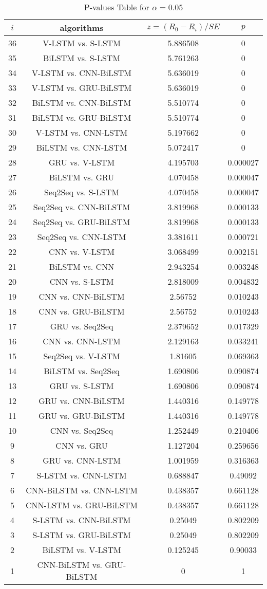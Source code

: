 \documentclass[a4paper,10pt]{article}
\begin{document}
\begin{landscape}
\begin{table}[!htp]
\centering\scriptsize
\begin{tabular}{cccc}
$i$&algorithms&$z=(R_0 - R_i)/SE$&$p$\\
\hline36&V-LSTM vs. S-LSTM&5.886508&0\\
35&BiLSTM vs. S-LSTM&5.761263&0\\
34&V-LSTM vs. CNN-BiLSTM&5.636019&0\\
33&V-LSTM vs. GRU-BiLSTM&5.636019&0\\
32&BiLSTM vs. CNN-BiLSTM&5.510774&0\\
31&BiLSTM vs. GRU-BiLSTM&5.510774&0\\
30&V-LSTM vs. CNN-LSTM&5.197662&0\\
29&BiLSTM vs. CNN-LSTM&5.072417&0\\
28&GRU vs. V-LSTM&4.195703&0.000027\\
27&BiLSTM vs. GRU&4.070458&0.000047\\
26&Seq2Seq vs. S-LSTM&4.070458&0.000047\\
25&Seq2Seq vs. CNN-BiLSTM&3.819968&0.000133\\
24&Seq2Seq vs. GRU-BiLSTM&3.819968&0.000133\\
23&Seq2Seq vs. CNN-LSTM&3.381611&0.000721\\
22&CNN vs. V-LSTM&3.068499&0.002151\\
21&BiLSTM vs. CNN&2.943254&0.003248\\
20&CNN vs. S-LSTM&2.818009&0.004832\\
19&CNN vs. CNN-BiLSTM&2.56752&0.010243\\
18&CNN vs. GRU-BiLSTM&2.56752&0.010243\\
17&GRU vs. Seq2Seq&2.379652&0.017329\\
16&CNN vs. CNN-LSTM&2.129163&0.033241\\
15&Seq2Seq vs. V-LSTM&1.81605&0.069363\\
14&BiLSTM vs. Seq2Seq&1.690806&0.090874\\
13&GRU vs. S-LSTM&1.690806&0.090874\\
12&GRU vs. CNN-BiLSTM&1.440316&0.149778\\
11&GRU vs. GRU-BiLSTM&1.440316&0.149778\\
10&CNN vs. Seq2Seq&1.252449&0.210406\\
9&CNN vs. GRU&1.127204&0.259656\\
8&GRU vs. CNN-LSTM&1.001959&0.316363\\
7&S-LSTM vs. CNN-LSTM&0.688847&0.49092\\
6&CNN-BiLSTM vs. CNN-LSTM&0.438357&0.661128\\
5&CNN-LSTM vs. GRU-BiLSTM&0.438357&0.661128\\
4&S-LSTM vs. CNN-BiLSTM&0.25049&0.802209\\
3&S-LSTM vs. GRU-BiLSTM&0.25049&0.802209\\
2&BiLSTM vs. V-LSTM&0.125245&0.90033\\
1&CNN-BiLSTM vs. GRU-BiLSTM&0&1\\
\hline
\end{tabular}
\caption{P-values Table for $\alpha=0.05$}
\end{table}\pagebreak


\end{landscape}
\end{document}
